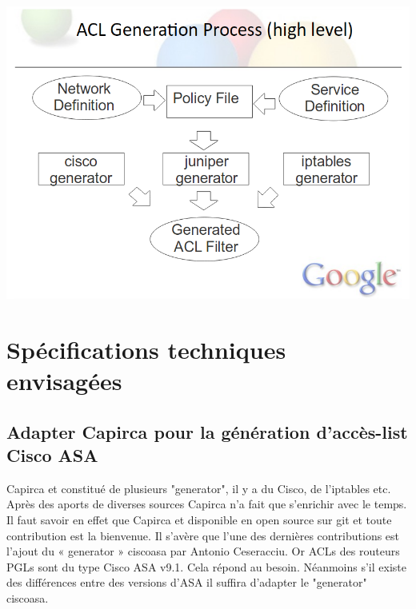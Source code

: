 \documentclass{article}
\begin{document}
\includegraphics[scale=0.4]{capirca.png}

\maketitle
\section{Spécifications techniques envisagées}

\maketitle
\subsection{Adapter Capirca pour la génération d’accès-list Cisco ASA}

Capirca et constitué de plusieurs "generator", il y a du Cisco, de l’iptables etc. Après des aports de diverses sources Capirca n’a fait que s’enrichir avec le temps. Il faut savoir en effet que Capirca et disponible en open source sur git et toute contribution est la bienvenue. Il s’avère que l’une des dernières contributions est l’ajout du « generator » ciscoasa par Antonio Ceseracciu. Or ACLs des routeurs PGLs sont du type Cisco ASA v9.1. Cela répond au besoin. Néanmoins s'il existe des différences entre des versions d'ASA il suffira d'adapter le "generator" ciscoasa.

\maketitle
\end{document}

